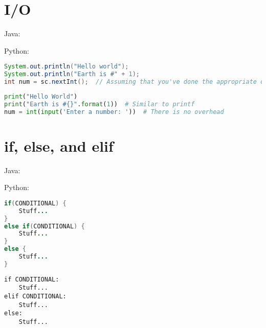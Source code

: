 \documentclass{article}
\begin{document}
\section{I/O}
\begin{minipage}{0.45\linewidth}
    Java:
\end{minipage}
\hfill
\begin{minipage}{0.45\linewidth}
    Python:
\end{minipage}

\begin{minipage}{0.45\linewidth}
    \begin{lstlisting}[language=Java]
System.out.println("Hello world");
System.out.println("Earth is #" + 1);
int num = sc.nextInt();  // Assuming that you've done the appropriate overhead
    \end{lstlisting}
\end{minipage}
\hfill
\begin{minipage}{0.45\linewidth}
    \begin{lstlisting}[language=Python]
print("Hello World")
print("Earth is #{}".format(1))  # Similar to printf
num = int(input('Enter a number: '))  # There is no overhead
    \end{lstlisting}
\end{minipage}

\section{if, else, and elif}
\begin{minipage}{0.45\linewidth}
    Java:
\end{minipage}
\hfill
\begin{minipage}{0.45\linewidth}
    Python:
\end{minipage}

\begin{minipage}{0.45\linewidth}
    \begin{lstlisting}[language=Java]
if(CONDITIONAL) {
    Stuff...
}
else if(CONDITIONAL) {
    Stuff...
}
else {
    Stuff...
}
    \end{lstlisting}
\end{minipage}
\hfill
\begin{minipage}{0.45\linewidth}
    \begin{lstlisting}
if CONDITIONAL:
    Stuff...
elif CONDITIONAL:
    Stuff...
else:
    Stuff...
    \end{lstlisting}
\end{minipage}
\end{document}
